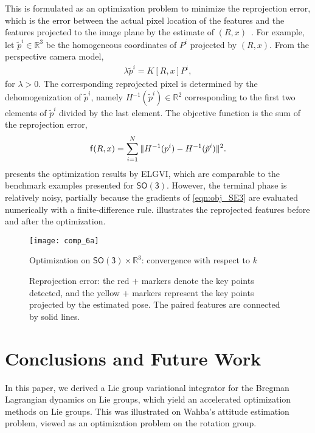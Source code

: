 \documentclass[letterpaper, 10pt, conference]{ieeeconf}
\newcommand{\SO}{\ensuremath{\mathsf{SO(3)}}}
\renewcommand{\Re}{\ensuremath{\mathbb{R}}}
\begin{document}
This is formulated as an optimization problem to minimize the reprojection error, which is the error between the actual pixel location of the features and the features projected to the image plane by the estimate of $(R,x)$~\cite{ma2012invitation}.
For example, let $\tilde p^i\in\Re^3$ be the homogeneous coordinates of $P^i$ projected by $(R,x)$. 
From the perspective camera model, 
\begin{align*}
    \lambda \tilde p^i = K[R, x]P^i,
\end{align*}
for $\lambda >0$.
The corresponding reprojected pixel is determined by the dehomogenization  of $\tilde p^i$, namely $H^{-1}(\tilde p^i)\in\Re^2$ corresponding to the first two elements of $\tilde p^i$ divided by the last element. 
The objective function is the sum of the reprojection error, 
\begin{align}
    \mathsf{f} (R,x) =  \sum_{i=1}^N \| H^{-1}(p^i) - H^{-1}(\tilde p^i)\|^2.\label{eqn:obj_SE3}
\end{align}
 presents the optimization results by ELGVI, which are comparable to the benchmark examples presented for $\SO$. 
However, the terminal phase is relatively noisy, partially because the gradients of \eqref{eqn:obj_SE3} are evaluated numerically with a finite-difference rule. 
 illustrates the reprojected features before and after the optimization. 

\begin{figure}
    \centerline{
        \texttt{[image: comp\_6a]}
    }
    \caption{Optimization on $\SO\times\Re^3$: convergence with respect to $k$}\label{fig:comp_6}
\end{figure}

\begin{figure}
    \centerline{
    }
    \centerline{
    }
    \caption{Reprojection error: the red $+$ markers denote the key points detected, and the yellow $+$ markers represent the key points projected by the estimated pose. The paired features are connected by solid lines. }\label{fig:KITTI}
\end{figure}

\section{Conclusions and Future Work}
In this paper, we derived a Lie group variational integrator for the Bregman Lagrangian dynamics on Lie groups, which yield an accelerated optimization methods on Lie groups. This was illustrated on Wahba's attitude estimation problem, viewed as an optimization problem on the rotation group.
\end{document}
